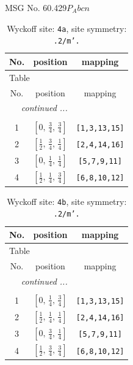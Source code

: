 \documentclass[fleqn,8pt]{jsarticle}
\begin{document}
\setcounter{MaxMatrixCols}{32}

\renewcommand{\tablename}{Table~}
\renewcommand{\figurename}{Figure~}
\begin{center}
\LARGE
MSG No. 60.429\quad$P_{A}bcn$
\end{center}
\renewcommand{\arraystretch}{1.2}
\begin{longtable}{ccc}
\caption{Wyckoff site: {\tt 4a}, site symmetry: {\tt .2/m'.}}
 \\
 \hline \hline
No. & position & mapping \\ \hline \endfirsthead

\multicolumn{2}{l}{\tablename\ \thetable{}} \\
 \hline \hline
No. & position & mapping \\ \hline \endhead

 \hline \hline
\multicolumn{2}{r}{\footnotesize\it continued ...} \\ \endfoot

 \hline \hline
\multicolumn{2}{r}{} \\ \endlastfoot

1 & $\left[ 0,\, \frac{3}{4},\, \frac{3}{4} \right]$ & {\tt [1,3,13,15]} \\ \hline
2 & $\left[ \frac{1}{2},\, \frac{3}{4},\, \frac{1}{4} \right]$ & {\tt [2,4,14,16]} \\ \hline
3 & $\left[ 0,\, \frac{1}{4},\, \frac{1}{4} \right]$ & {\tt [5,7,9,11]} \\ \hline
4 & $\left[ \frac{1}{2},\, \frac{1}{4},\, \frac{3}{4} \right]$ & {\tt [6,8,10,12]} \\
\end{longtable}
\renewcommand{\arraystretch}{1.2}
\begin{longtable}{ccc}
\caption{Wyckoff site: {\tt 4b}, site symmetry: {\tt .2/m'.}}
 \\
 \hline \hline
No. & position & mapping \\ \hline \endfirsthead

\multicolumn{2}{l}{\tablename\ \thetable{}} \\
 \hline \hline
No. & position & mapping \\ \hline \endhead

 \hline \hline
\multicolumn{2}{r}{\footnotesize\it continued ...} \\ \endfoot

 \hline \hline
\multicolumn{2}{r}{} \\ \endlastfoot

1 & $\left[ 0,\, \frac{1}{4},\, \frac{3}{4} \right]$ & {\tt [1,3,13,15]} \\ \hline
2 & $\left[ \frac{1}{2},\, \frac{1}{4},\, \frac{1}{4} \right]$ & {\tt [2,4,14,16]} \\ \hline
3 & $\left[ 0,\, \frac{3}{4},\, \frac{1}{4} \right]$ & {\tt [5,7,9,11]} \\ \hline
4 & $\left[ \frac{1}{2},\, \frac{3}{4},\, \frac{3}{4} \right]$ & {\tt [6,8,10,12]} \\
\end{longtable}
\end{document}

